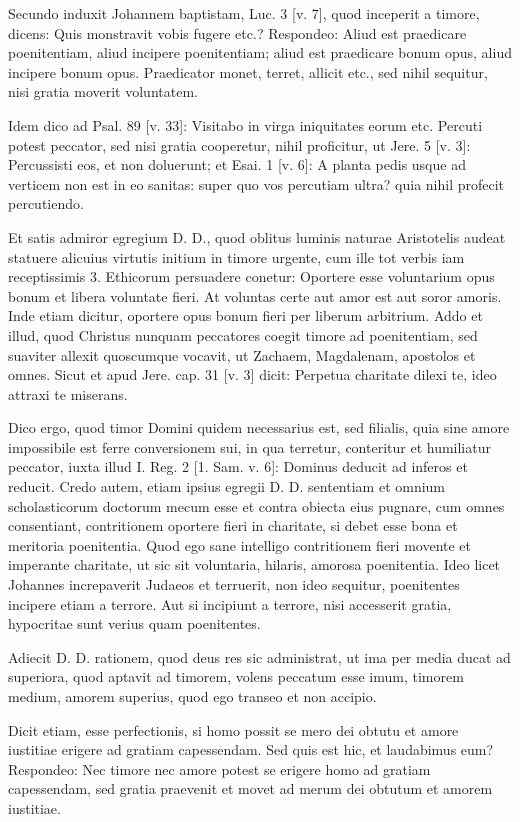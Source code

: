 Secundo induxit Johannem baptistam, Luc. 3 [v. 7], quod inceperit a timore, dicens: Quis monstravit vobis fugere etc.? Respondeo: Aliud est praedicare poenitentiam, aliud incipere poenitentiam; aliud est praedicare bonum opus, aliud incipere bonum opus. Praedicator monet, terret, allicit etc., sed nihil sequitur, nisi gratia moverit voluntatem.

Idem dico ad Psal. 89 [v. 33]: Visitabo in virga iniquitates eorum etc. Percuti potest peccator, sed nisi gratia cooperetur, nihil proficitur, ut Jere. 5 [v. 3]: \marginpar{\small[363]} Percussisti eos, et non doluerunt; et Esai. 1 [v. 6]: A planta pedis usque ad verticem non est in eo sanitas: super quo vos percutiam ultra? quia nihil profecit percutiendo.

Et satis admiror egregium D. D., quod oblitus luminis naturae Aristotelis audeat statuere alicuius virtutis initium in timore urgente, cum ille tot verbis iam receptissimis 3. Ethicorum persuadere conetur: Oportere esse voluntarium opus bonum et libera voluntate fieri. At voluntas certe aut amor est aut soror amoris. Inde etiam dicitur, oportere opus bonum fieri per liberum arbitrium. Addo et illud, quod Christus nunquam peccatores coegit timore ad poenitentiam, sed suaviter allexit quoscumque vocavit, ut Zachaem, Magdalenam, apostolos et omnes. Sicut et apud Jere. cap. 31 [v. 3] dicit: Perpetua charitate dilexi te, ideo attraxi te miserans.

Dico ergo, quod timor Domini quidem necessarius est, sed filialis, quia sine amore impossibile est ferre conversionem sui, in qua terretur, conteritur et humiliatur peccator, iuxta illud I. Reg. 2 [1. Sam. v. 6]: Dominus deducit ad inferos et reducit. Credo autem, etiam ipsius egregii D. D. sententiam et omnium scholasticorum doctorum mecum esse et contra obiecta eius pugnare, cum omnes consentiant, contritionem oportere fieri in charitate, si debet esse bona et meritoria poenitentia. Quod ego sane intelligo contritionem fieri movente et imperante charitate, ut sic sit voluntaria, hilaris, amorosa poenitentia. Ideo licet Johannes increpaverit Judaeos et terruerit, non ideo sequitur, poenitentes incipere etiam a terrore. Aut si incipiunt a terrore, nisi accesserit gratia, hypocritae sunt verius quam poenitentes.

Adiecit D. D. rationem, quod deus res sic administrat, ut ima per media ducat ad superiora, quod aptavit ad timorem, volens peccatum esse imum, timorem medium, amorem superius, quod ego transeo et non accipio.

Dicit etiam, esse perfectionis, si homo possit se mero dei obtutu et amore iustitiae erigere ad gratiam capessendam. Sed quis est hic, et laudabimus eum? Respondeo: Nec timore nec amore potest se erigere homo ad gratiam capessendam, sed gratia praevenit et movet ad merum dei obtutum et amorem iustitiae.

